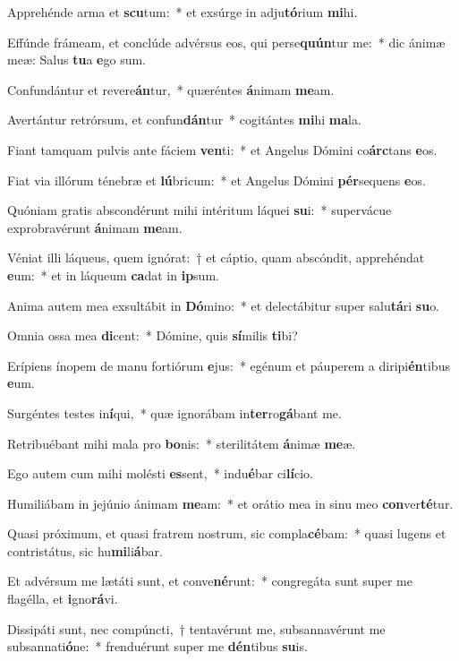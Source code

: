 \item Apprehénde arma et \textbf{scu}tum:~* et exsúrge in adju\textbf{tó}rium \textbf{mi}hi.
\item Effúnde frámeam, et conclúde advérsus eos, qui perse\textbf{quún}tur me:~* dic ánimæ meæ: Salus \textbf{tu}a \textbf{e}go sum.
\item Confundántur et revere\textbf{án}tur,~* quæréntes \textbf{á}nimam \textbf{me}am.
\item Avertántur retrórsum, et confun\textbf{dán}tur~* cogitántes \textbf{mi}hi \textbf{ma}la.
\item Fiant tamquam pulvis ante fáciem \textbf{ven}ti:~* et Angelus Dómini co\textbf{árc}tans \textbf{e}os.
\item Fiat via illórum ténebræ et \textbf{lú}bricum:~* et Angelus Dómini \textbf{pér}sequens \textbf{e}os.
\item Quóniam gratis abscondérunt mihi intéritum láquei \textbf{su}i:~* supervácue exprobravérunt \textbf{á}nimam \textbf{me}am.
\item Véniat illi láqueus, quem ignórat:~† et cáptio, quam abscóndit, apprehéndat \textbf{e}um:~* et in láqueum \textbf{ca}dat in \textbf{ip}sum.
\item Anima autem mea exsultábit in \textbf{Dó}mino:~* et delectábitur super salu\textbf{tá}ri \textbf{su}o.
\item Omnia ossa mea \textbf{di}cent:~* Dómine, quis \textbf{sí}milis \textbf{ti}bi?
\item Erípiens ínopem de manu fortiórum \textbf{e}jus:~* egénum et páuperem a diripi\textbf{én}tibus \textbf{e}um.
\item Surgéntes testes in\textbf{í}qui,~* quæ ignorábam in\textbf{ter}ro\textbf{gá}bant me.
\item Retribuébant mihi mala pro \textbf{bo}nis:~* sterilitátem \textbf{á}nimæ \textbf{me}æ.
\item Ego autem cum mihi molésti \textbf{es}sent,~* indu\textbf{é}bar ci\textbf{lí}cio.
\item Humiliábam in jejúnio ánimam \textbf{me}am:~* et orátio mea in sinu meo \textbf{con}ver\textbf{té}tur.
\item Quasi próximum, et quasi fratrem nostrum, sic compla\textbf{cé}bam:~* quasi lugens et contristátus, sic hu\textbf{mi}li\textbf{á}bar.
\item Et advérsum me lætáti sunt, et conve\textbf{né}runt:~* congregáta sunt super me flagélla, et \textbf{i}gno\textbf{rá}vi.
\item Dissipáti sunt, nec compúncti,~† tentavérunt me, subsannavérunt me subsannati\textbf{ó}ne:~* frenduérunt super me \textbf{dén}tibus \textbf{su}is.
